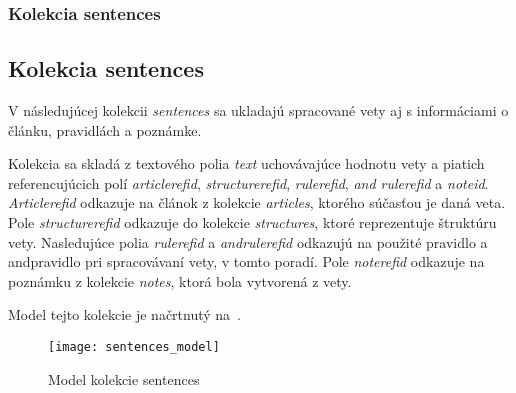 %
%
{
	\subsubsection{Kolekcia sentences}
}
{
	\subsection{Kolekcia sentences}
}
\label{subsubsection:collection_sentences}
V následujúcej kolekcii \textit{sentences} sa ukladajú spracované vety aj s informáciami o článku, pravidlách a poznámke.

Kolekcia sa skladá z textového polia \textit{text} uchovávajúce hodnotu vety a piatich referencujúcich polí \textit{article\textunderscore ref\textunderscore id}, \textit{structure\textunderscore ref\textunderscore id}, \textit{rule\textunderscore ref\textunderscore id}, \textit{and \textunderscore rule\textunderscore ref\textunderscore id} a \textit{note\textunderscore id}. \textit{Article\textunderscore ref\textunderscore id} odkazuje na článok z kolekcie \textit{articles}, ktorého súčasťou je daná veta. Pole \textit{structure\textunderscore ref\textunderscore id} odkazuje do kolekcie \textit{structures}, ktoré reprezentuje štruktúru vety. Nasledujúce polia \textit{rule\textunderscore ref\textunderscore id} a \textit{and\textunderscore rule\textunderscore ref\textunderscore id} odkazujú na použité pravidlo a and\hyph pravidlo pri spracovávaní vety, v tomto poradí. Pole \textit{note\textunderscore ref\textunderscore id} odkazuje na poznámku z kolekcie \textit{notes}, ktorá bola vytvorená z vety.

Model tejto kolekcie je načrtnutý na~.

\begin{figure}[H]
	\begin{center}\texttt{[image: sentences\_model]}\end{center}
	\caption[Model kolekcie sentences]{Model kolekcie sentences}\label{fig:sentences_collection_model}
\end{figure}

